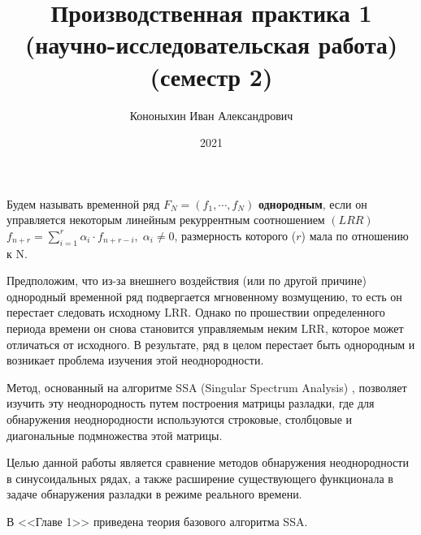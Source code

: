 \documentclass[specialist, substylefile = spbu.rtx,
			   subf, href, 12pt]{disser}
\begin{document}

\title{Производственная практика 1 (научно-исследовательская работа) (семестр 2)}


\author{Кононыхин Иван Александрович}


\date{2021}

\maketitle



\newpage
\tableofcontents
\newpage

\intro
Будем называть временной ряд $F_N = (f_1, \cdots, f_{N})$ \textbf{однородным}, если он управляется некоторым линейным рекуррентным соотношением $(LRR)$ $f_{n+r} = \sum_{i=1}^{r} \alpha_i\cdot f_{n+r-i}, \; \alpha_i \neq 0$, размерность которого ($r$) мала по отношению к $\mathrm{N}$. 

Предположим, что из-за внешнего воздействия (или по другой причине) однородный временной ряд подвергается мгновенному возмущению, то есть он перестает следовать исходному $\mathrm{LRR}$. Однако по прошествии определенного периода времени он снова становится управляемым неким $\mathrm{LRR}$, которое может отличаться от исходного. В результате, ряд в целом перестает быть однородным и возникает проблема изучения этой неоднородности.

Метод, основанный на алгоритме SSA (Singular Spectrum Analysis) \cite{TSStructure}, позволяет изучить эту неоднородность путем построения матрицы разладки, где для обнаружения неоднородности используются строковые, столбцовые и диагональные подмножества этой матрицы.

Целью данной работы является сравнение методов обнаружения неоднородности в синусоидальных рядах, а также расширение существующего функционала в задаче обнаружения разладки в режиме реального времени.

В <<Главе 1>> приведена теория базового алгоритма SSA.
\end{document}
